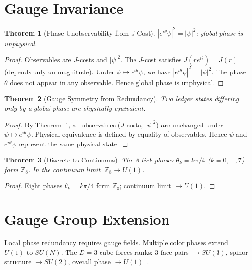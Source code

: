 \documentclass[12pt,a4paper]{article}
\newtheorem{theorem}{Theorem}[section]
\theoremstyle{definition}
\theoremstyle{remark}
\begin{document}
\section{Gauge Invariance}
\label{sec:gauge}

\begin{theorem}[Phase Unobservability from $J$-Cost]
\label{thm:phase-unobs}
$|e^{i\theta}\psi|^2 = |\psi|^2$: global phase is unphysical.
\end{theorem}

\begin{proof}
Observables are $J$-costs and $|\psi|^2$.  The $J$-cost satisfies
$J(re^{i\theta}) = J(r)$ (depends only on magnitude).  Under
$\psi \mapsto e^{i\theta}\psi$, we have $|e^{i\theta}\psi|^2 = |\psi|^2$.  The
phase $\theta$ does not appear in any observable.  Hence global phase is
unphysical.
\end{proof}

\begin{theorem}[Gauge Symmetry from Redundancy]
\label{thm:gauge-redundancy}
Two ledger states differing only by a global phase are physically equivalent.
\end{theorem}

\begin{proof}
By Theorem~\ref{thm:phase-unobs}, all observables ($J$-costs, $|\psi|^2$) are
unchanged under $\psi \mapsto e^{i\theta}\psi$.  Physical equivalence is
defined by equality of observables.  Hence $\psi$ and $e^{i\theta}\psi$
represent the same physical state.
\end{proof}

\begin{theorem}[Discrete to Continuous]
\label{thm:discrete-continuous}
The 8-tick phases $\theta_k = k\pi/4$ ($k = 0, \ldots, 7$) form
$\mathbb{Z}_8$.  In the continuum limit, $\mathbb{Z}_8 \to U(1)$.
\end{theorem}

\begin{proof}
Eight phases $\theta_k = k\pi/4$ form $\mathbb{Z}_8$; continuum limit
$\to U(1)$.
\end{proof}

\section{Gauge Group Extension}
\label{sec:gauge-group}

Local phase redundancy requires gauge fields.  Multiple color phases extend
$U(1)$ to $SU(N)$.  The $D=3$ cube forces ranks: 3 face pairs $\to SU(3)$,
spinor structure $\to SU(2)$, overall phase $\to U(1)$~\cite{RSGauge}.
\end{document}
